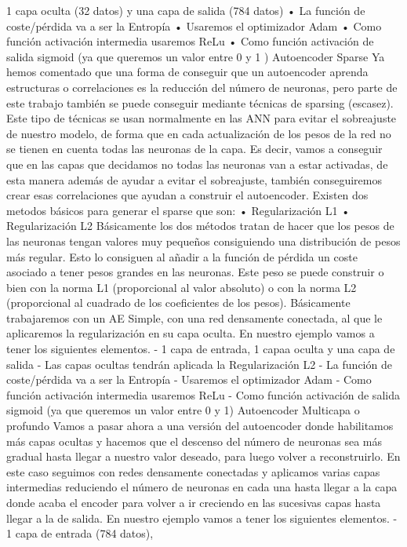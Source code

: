 \documentclass[
  a4paper,
  DIV=11,
  numbers=noendperiod]{scrreprt}
\begin{document}
1 capa oculta (32 datos) y una capa de salida (784 datos) • La función
de coste/pérdida va a ser la Entropía • Usaremos el optimizador Adam •
Como función activación intermedia usaremos ReLu • Como función
activación de salida sigmoid (ya que queremos un valor entre 0 y 1 )
Autoencoder Sparse Ya hemos comentado que una forma de conseguir que un
autoencoder aprenda estructuras o correlaciones es la reducción del
número de neuronas, pero parte de este trabajo también se puede
conseguir mediante técnicas de sparsing (escasez). Este tipo de técnicas
se usan normalmente en las ANN para evitar el sobreajuste de nuestro
modelo, de forma que en cada actualización de los pesos de la red no se
tienen en cuenta todas las neuronas de la capa. Es decir, vamos a
conseguir que en las capas que decidamos no todas las neuronas van a
estar activadas, de esta manera además de ayudar a evitar el
sobreajuste, también conseguiremos crear esas correlaciones que ayudan a
construir el autoencoder. Existen dos metodos básicos para generar el
sparse que son: • Regularización L1 • Regularización L2 Básicamente los
dos métodos tratan de hacer que los pesos de las neuronas tengan valores
muy pequeños consiguiendo una distribución de pesos más regular. Esto lo
consiguen al añadir a la función de pérdida un coste asociado a tener
pesos grandes en las neuronas. Este peso se puede construir o bien con
la norma L1 (proporcional al valor absoluto) o con la norma L2
(proporcional al cuadrado de los coeficientes de los pesos). Básicamente
trabajaremos con un AE Simple, con una red densamente conectada, al que
le aplicaremos la regularización en su capa oculta. En nuestro ejemplo
vamos a tener los siguientes elementos. - 1 capa de entrada, 1 capaa
oculta y una capa de salida - Las capas ocultas tendrán aplicada la
Regularización L2 - La función de coste/pérdida va a ser la Entropía -
Usaremos el optimizador Adam - Como función activación intermedia
usaremos ReLu - Como función activación de salida sigmoid (ya que
queremos un valor entre 0 y 1) Autoencoder Multicapa o profundo Vamos a
pasar ahora a una versión del autoencoder donde habilitamos más capas
ocultas y hacemos que el descenso del número de neuronas sea más gradual
hasta llegar a nuestro valor deseado, para luego volver a reconstruirlo.
En este caso seguimos con redes densamente conectadas y aplicamos varias
capas intermedias reduciendo el número de neuronas en cada una hasta
llegar a la capa donde acaba el encoder para volver a ir creciendo en
las sucesivas capas hasta llegar a la de salida. En nuestro ejemplo
vamos a tener los siguientes elementos. - 1 capa de entrada (784 datos),
\end{document}
